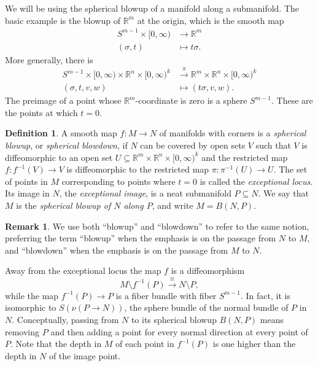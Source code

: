 \documentclass[11pt]{amsart}
\theoremstyle{definition}
\newtheorem{defn}{Definition}[section]
\newtheorem{rem}{Remark}[section]
\numberwithin{equation}{section}
\numberwithin{figure}{section}
\newcommand{\R}{\mathbb R}
\newcommand{\congar}{\overset\cong\longrightarrow}
\newcommand{\ourdefn}[1]{{\it #1}}
\begin{document}
We will be using the spherical blowup of a manifold along a submanifold. The basic example is the blowup of $\R^m$ at the origin, which is the smooth map
\begin{align*}
	S^{m-1} \times [0,\infty)  &\to \R^m  \\
	(\sigma,t) &\mapsto t\sigma.
\end{align*}
More generally, there is
\begin{align*}
	S^{m-1} \times [0,\infty) \times \R^{n} \times [0,\infty)^k &\xrightarrow{\pi} \R^m \times \R^{n} \times [0,\infty)^k \\
	(\sigma,t,v,w) &\mapsto (t\sigma,v,w).
\end{align*}
The preimage of a point whose $\R^m$-coordinate is zero is a sphere $S^{m-1}$. These are the points at which $t = 0$.

\begin{defn}\label{spherical_blowup}
A smooth map $f:M\to N$ of manifolds with corners is a \ourdefn{spherical blowup}, or \ourdefn{spherical blowdown}, if $N$ can be covered by open sets $V$ such that $V$ is diffeomorphic to an open set $U \subseteq \R^m \times \R^{n} \times [0,\infty)^k$ and the restricted map $f:f^{-1}(V)\to V$ is diffeomorphic to the restricted map $\pi: \pi^{-1}(U)\to U$. The set of points in $M$ corresponding to points where $t=0$ is called the \ourdefn{exceptional locus}. Its image in $N$, the \ourdefn{exceptional image}, is a neat submanifold $P \subseteq N$. We say that $M$ is the \ourdefn{spherical blowup of $N$ along $P$}, and write $M = B(N,P)$.
\end{defn}


\begin{rem}
	We use both ``blowup'' and ``blowdown'' to refer to the same notion, preferring the term ``blowup'' when the emphasis is on the passage from $N$ to $M$, and ``blowdown'' when the emphasis is on the passage from $M$ to $N$.
\end{rem}


Away from the exceptional locus the map $f$ is a diffeomorphism
\[ M \setminus f^{-1}(P) \congar N \setminus P, \]
while the map $f^{-1}(P) \to P$ is a fiber bundle with fiber $S^{m-1}$. In fact, it is isomorphic to $S(\nu(P \to N))$, the sphere bundle of the normal bundle of $P$ in $N$. Conceptually, passing from $N$ to its spherical blowup $B(N,P)$ means removing $P$ and then adding a point for every normal direction at every point of $P$. Note that the depth in $M$ of each point in $f^{-1}(P)$ is one higher than the depth in $N$ of the image point. 
\end{document}
